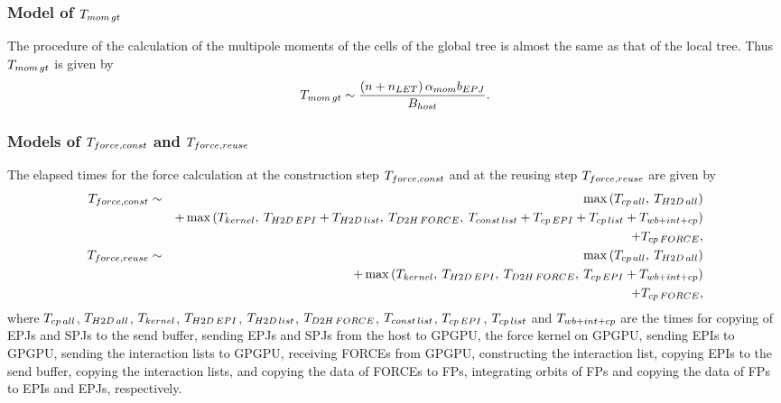 \documentclass[dvipdfmx]{pasj01}
\begin{document}
\subsubsection{Model of $T_{\rm mom\, gt}$}

The procedure of the calculation of the multipole moments of the cells
of the global tree is almost the same as that of the local tree. Thus
$T_{\rm mom\, gt}$ is given by
\begin{eqnarray}
  T_{\rm mom\, gt} \sim \frac{\left( n + n_{\rm LET} \right) \alpha_{\rm mom} b_{\rm EPJ}}{B_{\rm host}}.
\end{eqnarray}

\subsubsection{Models of $T_{\rm force, const}$ and $T_{\rm force, reuse}$}
The elapsed times for the force calculation at the construction step
$T_{\rm force, const}$ and at the reusing step $T_{\rm force, reuse}$
are given by
\begin{eqnarray}
  T_{\rm force, const} &\sim& \max \left( T_{\rm cp\, all},\: T_{\rm H2D\, all} \right) \nonumber \\
    && + \max \left( T_{\rm kernel},\: T_{\rm H2D\, EPI}+T_{\rm H2D\, list},\: T_{\rm D2H\, FORCE},\: T_{\rm const\, list} + T_{\rm cp\, EPI}+T_{\rm cp\, list}+T_{\rm wb+int+cp}  \right)  \nonumber \\
    && + T_{\rm cp\, FORCE}, \label{eq:t_force_const} \\
  T_{\rm force, reuse} &\sim& \max \left( T_{\rm cp\, all},\: T_{\rm H2D\, all} \right) \nonumber \\
  && + \max \left( T_{\rm kernel},\: T_{\rm H2D\, EPI},\: T_{\rm D2H\, FORCE},\: T_{\rm cp\, EPI}+T_{\rm wb+int+cp} \right) \nonumber \\
  && + T_{\rm cp\, FORCE}, \label{eq:t_force_reuse}
\end{eqnarray}
where $T_{\rm cp\, all}$, $T_{\rm H2D\, all}$, $T_{\rm kernel}$,
$T_{\rm H2D\, EPI}$, $T_{\rm H2D\, list}$, $T_{\rm D2H\, FORCE}$,
$T_{\rm const\, list}$, $T_{\rm cp\, EPI}$, $T_{\rm cp\, list}$ and
$T_{\rm wb+int+cp}$ are the times for copying of EPJs and SPJs to the
send buffer, sending EPJs and SPJs from the host to GPGPU, the force
kernel on GPGPU, sending EPIs to GPGPU, sending the interaction lists
to GPGPU, receiving FORCEs from GPGPU, constructing the interaction
list, copying EPIs to the send buffer, copying the interaction lists,
and copying the data of FORCEs to FPs, integrating orbits of FPs and
copying the data of FPs to EPIs and EPJs, respectively.
\end{document}
